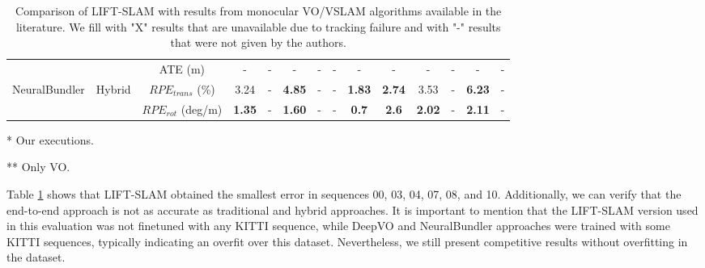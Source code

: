 \begin{table}[h]
\begin{threeparttable}
{\begin{tabular}{|c|c|c|ccccccccccc|}

                  &  & ATE (m) &-&-&-&-&-&-&-&-&-&-&- \\ 
NeuralBundler \cite{pose-graph-optimization}& Hybrid & $RPE_{trans}$ (\%) & 3.24 & - & \textbf{4.85} & - & - & \textbf{1.83} & \textbf{2.74} & 3.53 &-& \textbf{6.23} &- \\
                    && $RPE_{rot}$ (deg/m) & \textbf{1.35} & - & \textbf{1.60} & - & - &\textbf{0.7} & \textbf{2.6} & \textbf{2.02} & - &\textbf{2.11} & - \\\hline
                    
\end{tabular}}
        \begin{tablenotes}
            \item[*] {\footnotesize Our executions.}
            \item[**]{\footnotesize  Only VO.}
        \end{tablenotes}
\end{threeparttable}

\caption{Comparison of LIFT-SLAM with results from monocular VO/VSLAM algorithms available in the literature. We fill with "X" results that are unavailable due to tracking failure and with "-" results that were not given by the authors.}
\label{tab:comparison-sota}
\end{table}

Table \ref{tab:comparison-sota} shows that LIFT-SLAM obtained the smallest error in sequences 00, 03, 04, 07, 08, and 10. Additionally, we can verify that the end-to-end approach is not as accurate as traditional and hybrid approaches. It is important to mention that the LIFT-SLAM version used in this evaluation was not finetuned with any KITTI sequence, while DeepVO \cite{deep-vo} and NeuralBundler \cite{pose-graph-optimization} approaches were trained with some KITTI sequences,  typically indicating an overfit over this dataset. Nevertheless, we still present competitive results without overfitting in the dataset. 


